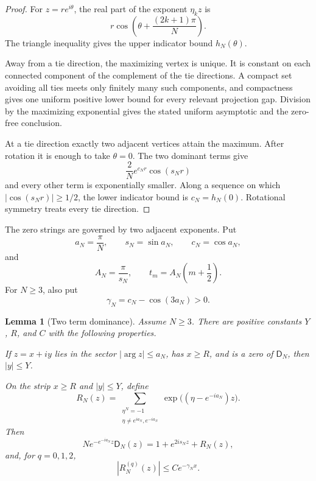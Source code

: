 \documentclass[11pt]{article}
\newtheorem{lemma}[lemma]{Lemma}
\theoremstyle{definition}
\theoremstyle{remark}
\newcommand{\Dfun}{\mathsf D}
\begin{document}
\begin{proof}
For $z=re^{i\theta}$, the real part of the exponent $\eta_kz$ is
\[
r\cos\left(\theta+\frac{(2k+1)\pi}{N}\right).
\]
The triangle inequality gives the upper indicator bound $h_N(\theta)$.

Away from a tie direction, the maximizing vertex is unique.  It is constant
on each connected component of the complement of the tie directions.  A
compact set avoiding all ties meets only finitely many such components, and
compactness gives one uniform positive lower bound for every relevant
projection gap.  Division by the maximizing exponential gives the stated
uniform asymptotic and the zero-free conclusion.

At a tie direction exactly two adjacent vertices attain the maximum.  After rotation it is enough to take $\theta=0$.  The two dominant terms give
\[
\frac2N e^{c_Nr}\cos(s_Nr)
\]
and every other term is exponentially smaller.  Along a sequence on which $|\cos(s_Nr)|\geq1/2$, the lower indicator bound is $c_N=h_N(0)$.  Rotational symmetry treats every tie direction.
\end{proof}

The zero strings are governed by two adjacent exponents.  Put
\[
a_N=\frac\pi N,
\qquad
s_N=\sin a_N,
\qquad
c_N=\cos a_N,
\]
and
\[
A_N=\frac\pi{s_N},
\qquad
 t_m=A_N\left(m+\frac12\right).
\]
For $N\geq3$, also put
\[
\gamma_N=c_N-\cos(3a_N)>0.
\]

\begin{lemma}[Two term dominance]\label{lem:two_term_dominance}
Assume $N\geq3$.  There are positive constants $Y$, $R$, and $C$ with the following properties.

If $z=x+iy$ lies in the sector $|\arg z|\leq a_N$, has $x\geq R$, and is a zero of $\Dfun_N$, then $|y|\leq Y$.

On the strip $x\geq R$ and $|y|\leq Y$, define
\[
R_N(z)
=
\sum_{\substack{\eta^N=-1\\
\eta\ne e^{ia_N},e^{-ia_N}}}
\exp\bigl((\eta-e^{-ia_N})z\bigr).
\]
Then
\[
N e^{-e^{-ia_N}z}\Dfun_N(z)
=
1+e^{2is_Nz}+R_N(z),
\]
and, for $q=0,1,2$,
\[
|R_N^{(q)}(z)|
\leq
C e^{-\gamma_Nx}.
\]
\end{lemma}
\end{document}
